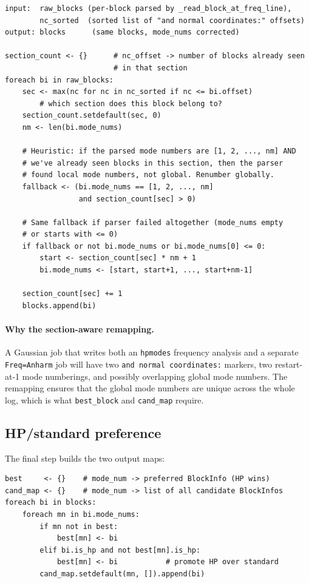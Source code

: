 \documentclass[10pt,a4paper,twoside]{article}
\newcommand{\fn}[1]{\texttt{#1}}
\begin{document}
\begin{lstlisting}[style=pseudo,
  caption={Mode-number resolution across sections. Implementation:
           \protect\fn{logio.read\_all\_meta}.}]
input:  raw_blocks (per-block parsed by _read_block_at_freq_line),
        nc_sorted  (sorted list of "and normal coordinates:" offsets)
output: blocks      (same blocks, mode_nums corrected)

section_count <- {}      # nc_offset -> number of blocks already seen
                         # in that section
foreach bi in raw_blocks:
    sec <- max(nc for nc in nc_sorted if nc <= bi.offset)
        # which section does this block belong to?
    section_count.setdefault(sec, 0)
    nm <- len(bi.mode_nums)

    # Heuristic: if the parsed mode numbers are [1, 2, ..., nm] AND
    # we've already seen blocks in this section, then the parser
    # found local mode numbers, not global. Renumber globally.
    fallback <- (bi.mode_nums == [1, 2, ..., nm]
                 and section_count[sec] > 0)

    # Same fallback if parser failed altogether (mode_nums empty
    # or starts with <= 0)
    if fallback or not bi.mode_nums or bi.mode_nums[0] <= 0:
        start <- section_count[sec] * nm + 1
        bi.mode_nums <- [start, start+1, ..., start+nm-1]

    section_count[sec] += 1
    blocks.append(bi)
\end{lstlisting}

\paragraph{Why the section-aware remapping.}
A Gaussian job that writes both an \fn{hpmodes} frequency analysis
and a separate \fn{Freq=Anharm} job will have two
\texttt{and normal coordinates:} markers, two restart-at-1
mode numberings, and possibly overlapping global mode numbers.
The remapping ensures that the global mode numbers are unique
across the whole log, which is what \fn{best\_block} and
\fn{cand\_map} require.

\subsection{HP/standard preference}

The final step builds the two output maps:

\begin{lstlisting}[style=pseudo]
best     <- {}    # mode_num -> preferred BlockInfo (HP wins)
cand_map <- {}    # mode_num -> list of all candidate BlockInfos
foreach bi in blocks:
    foreach mn in bi.mode_nums:
        if mn not in best:
            best[mn] <- bi
        elif bi.is_hp and not best[mn].is_hp:
            best[mn] <- bi           # promote HP over standard
        cand_map.setdefault(mn, []).append(bi)
\end{lstlisting}
\end{document}
